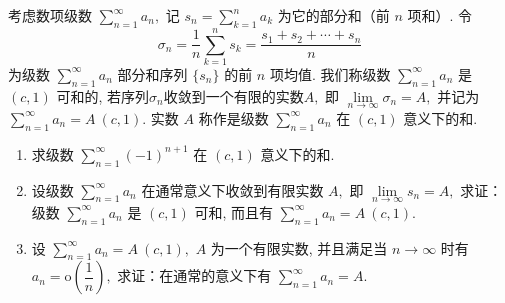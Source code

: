 \begin{question}[points = 12]
考虑数项级数 $\sum\limits_{n=1}^{\infty} a_n,$ 记 $s_n = \sum\limits_{k=1}^n a_k$ 为它的部分和（前 $n$ 项和）. 令
\[\sigma_n = \dfrac{1}{n} \sum\limits_{k=1}^n s_k = \dfrac{s_1 + s_2 + \cdots + s_n}{n}\]
为级数 $\sum\limits_{n=1}^{\infty} a_n$ 部分和序列 $\{s_n\}$ 的前 $n$ 项均值. 我们称级数 $\sum\limits_{n=1}^{\infty} a_n$ 是 $(c, 1)$ 可和的, 若序列$\sigma_n$收敛到一个有限的实数$A,$ 即 $\lim\limits_{n \to \infty} \sigma_n = A,$ 并记为 $\sum\limits_{n=1}^{\infty} a_n = A~(c, 1).$ 实数 $A$ 称作是级数 $\sum\limits_{n=1}^{\infty} a_n$ 在 $(c, 1)$ 意义下的和.
\begin{enumerate}
\item 求级数 $\sum\limits_{n=1}^{\infty} (-1)^{n+1}$ 在 $(c, 1)$ 意义下的和.
\item 设级数 $\sum\limits_{n=1}^{\infty} a_n$ 在通常意义下收敛到有限实数 $A,$ 即 $\lim\limits_{n \to \infty} s_n = A,$ 求证：级数 $\sum\limits_{n=1}^{\infty} a_n$ 是 $(c, 1)$ 可和, 而且有 $\sum\limits_{n=1}^{\infty} a_n = A~(c, 1).$
\item 设 $\sum\limits_{n=1}^{\infty} a_n = A~(c, 1),$ $A$ 为一个有限实数, 并且满足当 $n \to \infty$ 时有 $a_n = \mathrm{o}\left( \dfrac{1}{n} \right),$ 求证：在通常的意义下有 $\sum\limits_{n=1}^{\infty} a_n = A.$
\end{enumerate}

\end{question}

